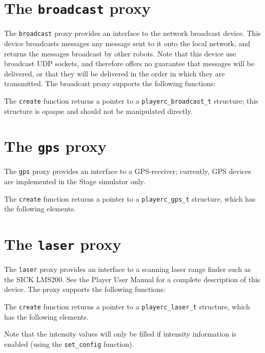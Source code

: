 \documentclass[11pt]{report}
\begin{document}
\section{The {\tt broadcast} proxy}

The {\tt broadcast} proxy provides an interface to the network
broadcast device.  This device broadcasts messages any message sent to
it onto the local network, and returns the messages broadcast by other
robots.  Note that this device use broadcast UDP sockets, and
therefore offers no guarantee that messages will be delivered, or that
they will be delivered in the order in which they are transmitted.
The broadcast proxy supports the following functions:
\begin{quote}

\end{quote}
The {\tt create} function returns a pointer to a {\tt playerc\_broadcast\_t}
structure; this structure is opaque and should not be manipulated directly.


\newpage
\section{The {\tt gps} proxy}

\noindent The {\tt gps} proxy provides an interface to a GPS-receiver;
currently, GPS devices are implemented in the Stage simulator only.
\begin{quote}

\end{quote}
The {\tt create} function returns a pointer to a {\tt playerc\_gps\_t}
structure, which has the following elements.
\begin{quote}

\end{quote}


\newpage
\section{The {\tt laser} proxy}

The {\tt laser} proxy provides an interface to a scanning laser range
finder such as the SICK LMS200.  See the Player User Manual for a
complete description of this device.  The proxy supports the
following functions:
\begin{quote}

\end{quote}
The {\tt create} function returns a pointer to a {\tt playerc\_laser\_t}
structure, which has the following elements.
\begin{quote}

\end{quote}
Note that the intensity values will only be filled if intensity information
is enabled (using the {\tt set\_config} function).
\end{document}
